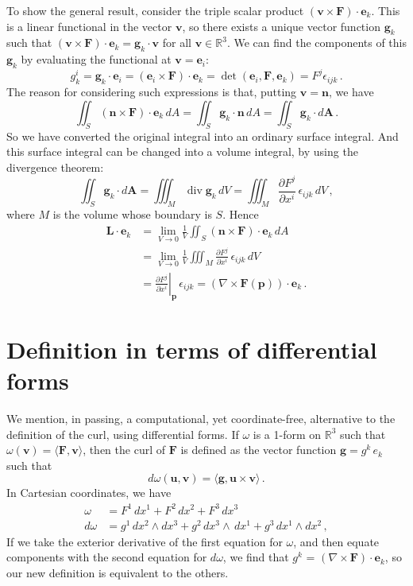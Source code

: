 \documentclass[12pt]{article}
\newcommand{\real}{\mathbb{R}}
\newcommand{\vA}{\mathbf{A}}
\newcommand{\vg}{\mathbf{g}}
\newcommand{\vu}{\mathbf{u}}
\newcommand{\vv}{\mathbf{v}}
\newcommand{\ve}{\mathbf{e}}
\newcommand{\vF}{\mathbf{F}}
\newcommand{\vL}{\mathbf{L}}
\newcommand{\vn}{\mathbf{n}}
\newcommand{\vp}{\mathbf{p}}
\newcommand{\cross}{\times}
\DeclareMathOperator{\diverg}{div}
\begin{document}
To show the general result,
consider the triple scalar product
$(\vv \times \vF) \cdot \ve_k$.
This is a linear functional in the vector $\vv$,
so there exists
a unique vector function $\vg_k$ such that
$(\vv \times \vF) \cdot \ve_k = \vg_k \cdot \vv$ for all $\vv \in \real^3$.
We can find the components of this $\vg_k$ by evaluating the functional
at $\vv = \ve_i$:
\[
g_k^i = \vg_k \cdot \ve_i = (\ve_i \times \vF) \cdot \ve_k = \det(\ve_i, \vF, \ve_k) = F^j \epsilon_{ijk}\,.
\]
The reason for considering such expressions is that, putting $\vv = \vn$, we have
\[
\iint_{S} (\vn \times \vF) \cdot \ve_k \, dA =
\iint_{S} \vg_k \cdot \vn \, dA = \iint_{S} \vg_k \cdot d\vA\,.
\]
So we have converted the original integral into an ordinary surface integral.
And this surface integral can be changed into a volume integral, by using the divergence theorem:
\[
\iint_S \vg_k \cdot d\vA = \iiint_M \diverg \vg_k \, dV = \iiint_M \frac{\partial F^j}{\partial x^i} \, \epsilon_{ijk} \, dV\,,
\]
where $M$ is the volume whose boundary is $S$.
Hence
\begin{align*}
\vL \cdot \ve_k &= \lim_{V \to 0} \frac{1}{V} \iint_S (\vn \times \vF) \cdot \ve_k \, dA 
\\ &= 
\lim_{V \to 0} \frac{1}{V} \iiint_M \frac{\partial F^j}{\partial x^i} \, \epsilon_{ijk} \, dV \\ &=
\left.\frac{\partial F^j}{\partial x^i}\right|_\vp \, \epsilon_{ijk} = (\nabla \cross \vF(\vp)) \cdot \ve_k \,.
\end{align*}

\section*{Definition in terms of differential forms}
We mention, in passing,
a computational, yet coordinate-free, alternative to the definition of the curl,
using differential forms.
If $\omega$ is a 1-form on $\real^3$ such that $\omega(\vv) = \langle \vF, \vv \rangle$,
then the curl of $\vF$ is defined as the vector function $\vg = g^k \, e_k$ such that
\[
d\omega(\vu, \vv) = \langle \vg, \vu \cross \vv \rangle\,.
\]
In Cartesian coordinates, we have
\begin{align*}
\omega &= F^1 \, dx^1 + F^2 \, dx^2 + F^3 \, dx^3 \\
d\omega &= g^1 \, dx^2 \wedge dx^3 + g^2 \, dx^3 \wedge \, dx^1 + g^3 \, dx^1 \wedge dx^2\,,
\end{align*}
If we take the exterior derivative of the first equation for $\omega$, and then equate components
with the second equation for $d\omega$,
we find that $g^k$ = $(\nabla \cross \vF) \cdot \ve_k$,
so our new definition is equivalent to the others.
\end{document}
